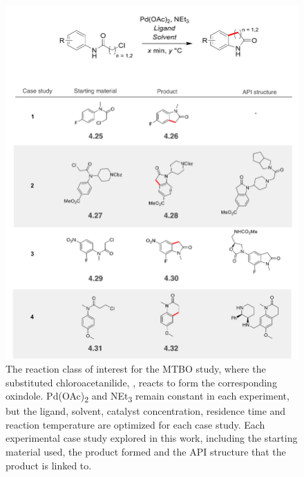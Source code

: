 \begin{figure}
    \centering
    \includegraphics[width=\textwidth]{gfx/Chapter04/ch_activation_case_studies.png}
    \caption{ The reaction class of interest for the MTBO study, where the substituted chloroacetanilide, , reacts to form the corresponding oxindole. Pd(OAc)\textsubscript{2} and NEt\textsubscript{3} remain constant in each experiment, but the ligand, solvent, catalyst concentration, residence time and reaction temperature are optimized for each case study. Each experimental case study explored in this work, including the starting material used, the product formed and the API structure that the product is linked to.}
    \label{fig:ch_activation}
\end{figure}

